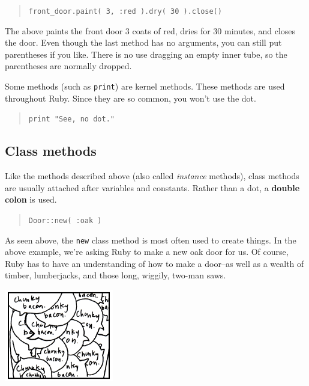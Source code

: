 \documentclass[10pt,twoside]{report}
\begin{document}
\begin{quote}
\lstinline[breaklines=true]|front_door.paint( 3, :red ).dry( 30 ).close()|\end{quote}


The above paints the front door 3 coats of red, dries for 30 minutes,
and closes the door.  Even though the last method has no arguments,
you can still put parentheses if you like.  There is no use dragging
an empty inner tube, so the parentheses are normally dropped.

Some methods (such as \lstinline[breaklines=true]|print|) are kernel
methods.  These methods are used throughout Ruby.  Since they are so
common, you won't use the dot.

\begin{quote}
\lstinline[breaklines=true]|print "See, no dot."|\end{quote}




\subsection{Class methods}



Like the methods described above (also called {\em instance} methods),
class methods are usually attached after variables and constants.
Rather than a dot, a {\bf double colon} is used.

\begin{quote}
\lstinline[breaklines=true]|Door::new( :oak )|\end{quote}


As seen above, the \lstinline[breaklines=true]|new| class method is
most often used to create things.  In the above example, we're asking
Ruby to make a new oak door for us.  Of course, Ruby has to have an
understanding of how to make a door--as well as a wealth of timber,
lumberjacks, and those long, wiggily, two-man saws.

	\includegraphics[width=0.3575\textwidth]{cache/12.png}
\end{document}

